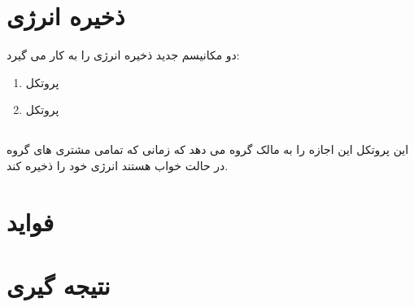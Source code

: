 \section{ذخیره انرژی}
دو مکانیسم جدید ذخیره انرژی را به کار می گیرد:
\begin{enumerate}
	\item پروتکل 
	\item پروتکل 
	
\end{enumerate}
\subsection{}
این پروتکل این اجازه را به مالک گروه می دهد که زمانی که تمامی مشتری های گروه در حالت خواب
هستند انرژی خود را ذخیره کند.

\subsection{}

\section{فواید}
\section{نتیجه گیری}


